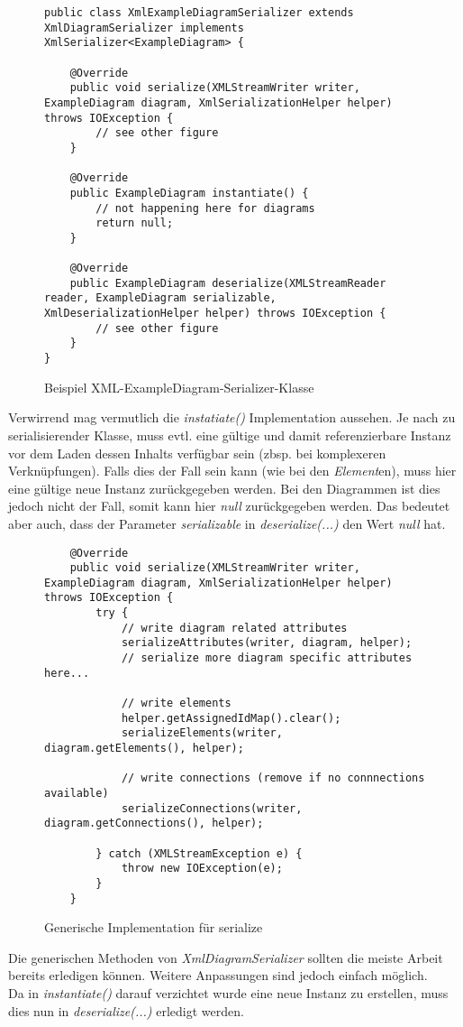 \begin{figure}[H]
	\centering
	\begin{lstlisting}
public class XmlExampleDiagramSerializer extends XmlDiagramSerializer implements XmlSerializer<ExampleDiagram> {

    @Override
    public void serialize(XMLStreamWriter writer, ExampleDiagram diagram, XmlSerializationHelper helper) throws IOException {
        // see other figure
    }

    @Override
    public ExampleDiagram instantiate() {
        // not happening here for diagrams
        return null;
    }

    @Override
    public ExampleDiagram deserialize(XMLStreamReader reader, ExampleDiagram serializable, XmlDeserializationHelper helper) throws IOException {
        // see other figure
    }
}
	\end{lstlisting}
	\caption{Beispiel XML-ExampleDiagram-Serializer-Klasse}
\end{figure}

Verwirrend mag vermutlich die \textit{instatiate()} Implementation aussehen. Je nach zu serialisierender
Klasse, muss evtl. eine gültige und damit referenzierbare Instanz vor dem Laden dessen Inhalts verfügbar
sein (zbsp. bei komplexeren Verknüpfungen). Falls dies der Fall sein kann (wie bei den \textit{Element}en),
muss hier eine gültige neue Instanz zurückgegeben werden. Bei den Diagrammen ist dies jedoch nicht der
Fall, somit kann hier \textit{null} zurückgegeben werden. Das bedeutet aber auch, dass der Parameter
\textit{serializable} in \textit{deserialize(...)} den Wert \textit{null} hat.


\begin{figure}[H]
	\centering
	\begin{lstlisting}
    @Override
    public void serialize(XMLStreamWriter writer, ExampleDiagram diagram, XmlSerializationHelper helper) throws IOException {
        try {
            // write diagram related attributes
            serializeAttributes(writer, diagram, helper);
            // serialize more diagram specific attributes here...

            // write elements
            helper.getAssignedIdMap().clear();
            serializeElements(writer, diagram.getElements(), helper);

            // write connections (remove if no connnections available)
            serializeConnections(writer, diagram.getConnections(), helper);

        } catch (XMLStreamException e) {
            throw new IOException(e);
        }
    }
	\end{lstlisting}
	\caption{Generische Implementation für serialize}
\end{figure}
Die generischen Methoden von \textit{XmlDiagramSerializer} sollten die meiste Arbeit bereits erledigen
können. Weitere Anpassungen sind jedoch einfach möglich. \\
Da in \textit{instantiate()} darauf verzichtet wurde eine neue Instanz zu erstellen, muss dies nun in
\textit{deserialize(...)} erledigt werden.

